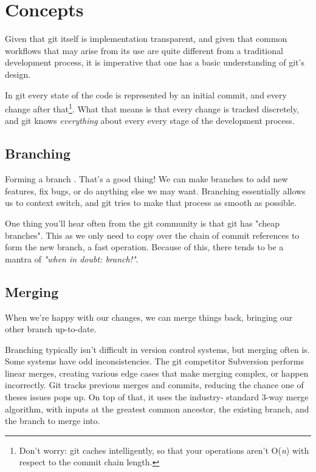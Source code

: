 \documentclass[11pt,letterpaper,twoside]{report}
\begin{document}
\chapter{Concepts}

Given that git itself is implementation transparent, and given that common
workflows that may arise from its use are quite different from a traditional
development process, it is imperative that one has a basic understanding of
git's design.

In git every state of the code is represented by an initial commit, and every
change after that\footnote{Don't worry: git caches intelligently, so that your
operations aren't O(\textit{n}) with respect to the commit chain length.}. What
that means is that every change is tracked discretely, and git knows
\emph{everything} about every every stage of the development process.

\section{Branching}

Forming a branch . That's a good
thing! We can make branches to add new features, fix bugs, or do anything else
we may want. Branching essentially allows us to context switch, and git tries to
make that process as smooth as possible.

One thing you'll hear often from the git community is that git has "cheap
branches". This as we only need to copy over the chain of commit references to
form the new branch, a fast operation. Because of this, there tends to be a
mantra of \emph{"when in doubt: branch!"}.

\section{Merging}

When we're happy with our changes, we can merge things back, bringing our other
branch up-to-date.

Branching typically isn't difficult in version control systems, but merging
often is. Some systems have odd inconsistencies. The git competitor Subversion
performs linear merges, creating various edge cases that make merging complex,
or happen incorrectly. Git tracks previous merges and commits, reducing the
chance one of theses issues pops up. On top of that, it uses the industry-
standard 3-way merge algorithm, with inputs at the greatest common ancestor, the
existing branch, and the branch to merge into.
\end{document}
